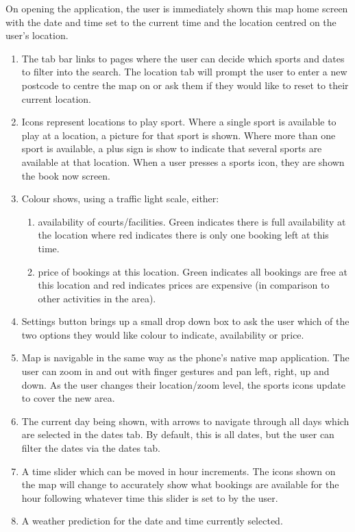 On opening the application, the user is immediately shown this map home screen
with the date and time set to the current time and the location centred on the
user's location.
\begin{enumerate}
	\item The tab bar links to pages where the user can decide which sports and
		dates to filter into the search. The location tab will prompt the user
		to enter a new postcode to centre the map on or ask them if they would
		like to reset to their current location.
	\item Icons represent locations to play sport. Where a single sport is
		available to play at a location, a picture for that sport is shown.
		Where more than one sport is available, a plus sign is show to indicate
		that several sports are available at that location. When a user presses
		a sports icon, they are shown the book now screen.
	\item Colour shows, using a traffic light scale, either:
		\begin{enumerate}
			\item availability of courts/facilities. Green indicates there is
				full availability at the location where red indicates there is
				only one booking left at this time.
			\item price of bookings at this location. Green indicates all
				bookings are free at this location and red indicates prices are
				expensive (in comparison to other activities in the area).
		\end{enumerate}

	\item Settings button brings up a small drop down box to ask the user which
		of the two options they would like colour to indicate, availability or
		price.
	\item Map is navigable in the same way as the phone's native map
		application.  The user can zoom in and out with finger gestures and pan
		left, right, up and down. As the user changes their location/zoom
		level, the sports icons update to cover the new area.
	\item The current day being shown, with arrows to navigate through all days
		which are selected in the dates tab. By default, this is all dates, but
		the user can filter the dates via the dates tab.
	\item A time slider which can be moved in hour increments. The icons shown
		on the map will change to accurately show what bookings are available
		for the hour following whatever time this slider is set to by the user.
	\item A weather prediction for the date and time currently selected.
\end{enumerate}

